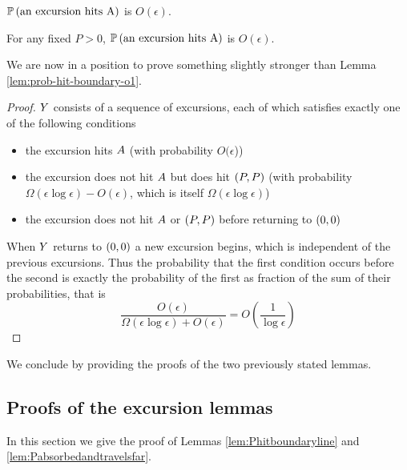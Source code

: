 {\newcommand{\Omegaeloge}{\Omega(\epsilon\log\epsilon)}

\begin{lemma}
  \label{lem:Phitboundaryline}
  $\mathbb{P}\left(\text{an excursion hits A}\right)$ is $O(\epsilon)$.
\end{lemma}

\begin{lemma}
  \label{lem:Pabsorbedandtravelsfar}
  For any fixed $P > 0$, $\mathbb{P}\left(\text{an excursion hits A}\right)$ is $O(\epsilon)$.
\end{lemma}

We are now in a position to prove something slightly stronger than
Lemma \ref{lem:prob-hit-boundary-o1}.

\begin{lemma*}
\end{lemma*}

\newcommand{\Oe}{O(\epsilon)}

\begin{proof}
  $Y$ consists of a sequence of excursions, each of which satisfies
  exactly one of the following conditions
  \begin{itemize}
  \item the excursion hits $A$ (with probability
    $O(\epsilon$))
  \item the excursion does not hit $A$ but does hit
    $(P,P)$ (with probability $\Omegaeloge-\Oe$, which is itself
    $\Omegaeloge$) 
  \item the excursion does not hit $A$ or $(P,P)$ before
    returning to $(0,0)$
  \end{itemize}
  When $Y$ returns to $(0,0)$ a new excursion begins, which is independent of
  the previous excursions.  Thus the probability that the first
  condition occurs before the second is exactly the probability of the
  first as fraction of the sum of their probabilities, that is
  \[
  \frac{\Oe}{\Omegaeloge + \Oe} = O\left(\frac{1}{\log\epsilon}\right)
  \]
\end{proof}

We conclude by providing the proofs of the two previously
stated lemmas.

\subsection{Proofs of the excursion lemmas}

In this section we give the proof of Lemmas \ref{lem:Phitboundaryline} 
and \ref{lem:Pabsorbedandtravelsfar}.

}
